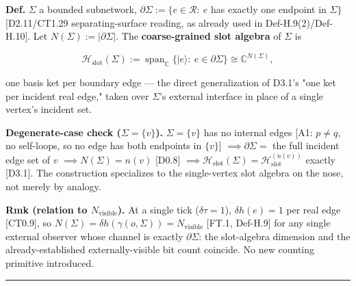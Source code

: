 \begin{definition}\label{tag:Def-H-12}
\textbf{Def.} $\Sigma$ a bounded subnetwork, $\partial\Sigma:=\{e\in\mathcal R:\ e$ has exactly one endpoint in $\Sigma\}$ [D2.11/CT1.29 separating-surface reading, as already used in Def-H.9(2)/Def-H.10]. Let $N(\Sigma):=|\partial\Sigma|$. The \textbf{coarse-grained slot algebra} of $\Sigma$ is

\[
\mathcal H_{\mathrm{slot}}(\Sigma):=\operatorname{span}_{\mathbb C}\{|e\rangle:\ e\in\partial\Sigma\}\cong\mathbb C^{N(\Sigma)},
\]

one basis ket per boundary edge — the direct generalization of D3.1's "one ket per incident real edge," taken over $\Sigma$'s external interface in place of a single vertex's incident set.

\textbf{Degenerate-case check ($\Sigma=\{v\}$).} $\Sigma=\{v\}$ has no internal edges [A1: $p\ne q$, no self-loops, so no edge has both endpoints in $\{v\}$] $\implies\partial\Sigma=$ the full incident edge set of $v$ $\implies N(\Sigma)=n(v)$ [D0.8] $\implies\mathcal H_{\mathrm{slot}}(\Sigma)=\mathcal H^{(n(v))}_{\mathrm{slot}}$ exactly [D3.1]. The construction specializes to the single-vertex slot algebra on the nose, not merely by analogy.

\textbf{Rmk (relation to $N_{\mathrm{visible}}$).} At a single tick ($\delta\tau=1$), $\delta h(e)=1$ per real edge [CT0.9], so $N(\Sigma)=\delta h(\gamma(o,\Sigma))=N_{\mathrm{visible}}$ [FT.1, Def-H.9] for any single external observer whose channel is exactly $\partial\Sigma$: the slot-algebra dimension and the already-established externally-visible bit count coincide. No new counting primitive introduced.

\vspace{2pt}\noindent\rule{\textwidth}{0.4pt}\vspace{2pt}

\end{definition}

